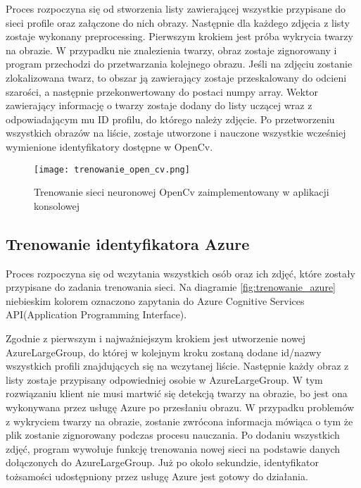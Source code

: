 Proces rozpoczyna się od stworzenia listy zawierającej wszystkie przypisane do sieci profile oraz załączone do nich obrazy. Następnie dla każdego zdjęcia z listy zostaje wykonany preprocessing. Pierwszym krokiem jest próba wykrycia twarzy na obrazie. W przypadku nie znalezienia twarzy, obraz zostaje zignorowany i program przechodzi do przetwarzania kolejnego obrazu. Jeśli na zdjęciu zostanie zlokalizowana twarz, to obszar ją zawierający zostaje przeskalowany do odcieni szarości, a następnie przekonwertowany do postaci numpy array. Wektor zawierający informację o twarzy zostaje dodany do listy uczącej wraz z odpowiadającym mu ID profilu, do którego należy zdjęcie. Po przetworzeniu wszystkich obrazów na liście, zostaje utworzone i nauczone wszystkie wcześniej wymienione identyfikatory dostępne w OpenCv.
\begin{figure}[H]
	\centering
	\texttt{[image: trenowanie\_open\_cv.png]}
	\caption{Trenowanie sieci neuronowej OpenCv zaimplementowany w aplikacji konsolowej}
	\label{fig:trenowanie_open_cv}
\end{figure}

\subsection{Trenowanie identyfikatora Azure} \label{trenowanie_azure}
Proces rozpoczyna się od wczytania wszystkich osób oraz ich zdjęć, które zostały przypisane do zadania trenowania sieci. Na diagramie \ref{fig:trenowanie_azure} niebieskim kolorem oznaczono zapytania do Azure Cognitive Services API(Application Programming Interface).

Zgodnie z  pierwszym i najważniejszym krokiem jest utworzenie nowej AzureLargeGroup, do której w kolejnym kroku zostaną dodane id/nazwy wszystkich profili znajdujących się na wczytanej liście.  Następnie każdy obraz z listy zostaje przypisany odpowiedniej osobie w AzureLargeGroup. W tym rozwiązaniu klient nie musi martwić się detekcją twarzy na obrazie, bo jest ona wykonywana przez usługę Azure po przesłaniu obrazu. W przypadku problemów z wykryciem twarzy na obrazie, zostanie zwrócona informacja mówiąca o tym że plik zostanie zignorowany podczas procesu nauczania. Po dodaniu wszystkich zdjęć, program wywołuje funkcję trenowania nowej sieci na podstawie danych dołączonych do AzureLargeGroup. Już po około sekundzie, identyfikator tożsamości udostępniony przez usługę Azure jest gotowy do działania.

